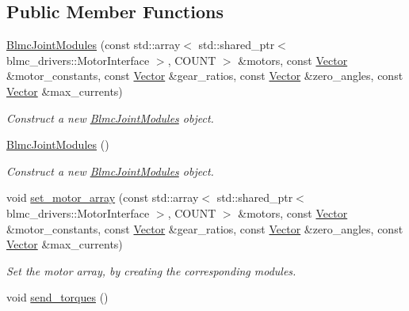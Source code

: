 \subsection*{Public Member Functions}
\begin{DoxyCompactItemize}
\item 
\hyperlink{classblmc__robots_1_1BlmcJointModules_a74910d81a89f9b1713ce8fecc69191fe}{Blmc\+Joint\+Modules} (const std\+::array$<$ std\+::shared\+\_\+ptr$<$ blmc\+\_\+drivers\+::\+Motor\+Interface $>$, C\+O\+U\+NT $>$ \&motors, const \hyperlink{classblmc__robots_1_1BlmcJointModules_abaff382c6fd4b494ec0c17498d94919e}{Vector} \&motor\+\_\+constants, const \hyperlink{classblmc__robots_1_1BlmcJointModules_abaff382c6fd4b494ec0c17498d94919e}{Vector} \&gear\+\_\+ratios, const \hyperlink{classblmc__robots_1_1BlmcJointModules_abaff382c6fd4b494ec0c17498d94919e}{Vector} \&zero\+\_\+angles, const \hyperlink{classblmc__robots_1_1BlmcJointModules_abaff382c6fd4b494ec0c17498d94919e}{Vector} \&max\+\_\+currents)
\begin{DoxyCompactList}\small\item\em Construct a new \hyperlink{classblmc__robots_1_1BlmcJointModules}{Blmc\+Joint\+Modules} object. \end{DoxyCompactList}\item 
\hyperlink{classblmc__robots_1_1BlmcJointModules_af4c700a8d346ceaebece38928b5e7ca6}{Blmc\+Joint\+Modules} ()\hypertarget{classblmc__robots_1_1BlmcJointModules_af4c700a8d346ceaebece38928b5e7ca6}{}\label{classblmc__robots_1_1BlmcJointModules_af4c700a8d346ceaebece38928b5e7ca6}

\begin{DoxyCompactList}\small\item\em Construct a new \hyperlink{classblmc__robots_1_1BlmcJointModules}{Blmc\+Joint\+Modules} object. \end{DoxyCompactList}\item 
void \hyperlink{classblmc__robots_1_1BlmcJointModules_a905addfe3271be5bc88bd785c5cbb032}{set\+\_\+motor\+\_\+array} (const std\+::array$<$ std\+::shared\+\_\+ptr$<$ blmc\+\_\+drivers\+::\+Motor\+Interface $>$, C\+O\+U\+NT $>$ \&motors, const \hyperlink{classblmc__robots_1_1BlmcJointModules_abaff382c6fd4b494ec0c17498d94919e}{Vector} \&motor\+\_\+constants, const \hyperlink{classblmc__robots_1_1BlmcJointModules_abaff382c6fd4b494ec0c17498d94919e}{Vector} \&gear\+\_\+ratios, const \hyperlink{classblmc__robots_1_1BlmcJointModules_abaff382c6fd4b494ec0c17498d94919e}{Vector} \&zero\+\_\+angles, const \hyperlink{classblmc__robots_1_1BlmcJointModules_abaff382c6fd4b494ec0c17498d94919e}{Vector} \&max\+\_\+currents)
\begin{DoxyCompactList}\small\item\em Set the motor array, by creating the corresponding modules. \end{DoxyCompactList}\item 
void \hyperlink{classblmc__robots_1_1BlmcJointModules_a26d4d675142bc783c1f983d135a41a09}{send\+\_\+torques} ()\hypertarget{classblmc__robots_1_1BlmcJointModules_a26d4d675142bc783c1f983d135a41a09}{}\label{classblmc__robots_1_1BlmcJointModules_a26d4d675142bc783c1f983d135a41a09}


\end{DoxyCompactItemize}
